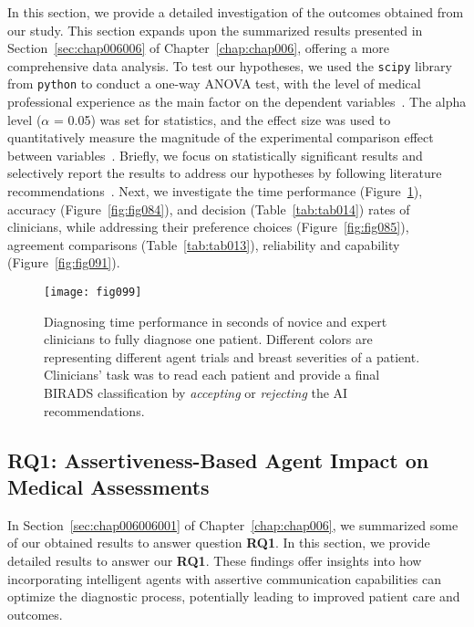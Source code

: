 In this section, we provide a detailed investigation of the outcomes obtained from our study.
This section expands upon the summarized results presented in Section~\ref{sec:chap006006} of Chapter~\ref{chap:chap006}, offering a more comprehensive data analysis.
To test our hypotheses, we used the \texttt{scipy} library from \texttt{python} to conduct a one-way \ac{ANOVA} test, with the level of medical professional experience as the main factor on the dependent variables~\cite{CASALE2022107302}.
The alpha level ($\alpha$ = 0.05) was set for statistics, and the effect size was used to quantitatively measure the magnitude of the experimental comparison effect between variables~\cite{Yigit_Mendes_2018, 10.1145/3180155.3182556}.
Briefly, we focus on statistically significant results and selectively report the results to address our hypotheses by following literature recommendations~\cite{10.1145/3301275.3302289, 10.1145/3290605.3300234, 10.1145/3491102.3517791}.
Next, we investigate the time performance (Figure~\ref{fig:fig099}), accuracy (Figure~\ref{fig:fig084}), and decision (Table~\ref{tab:tab014}) rates of clinicians, while addressing their preference choices (Figure~\ref{fig:fig085}), agreement comparisons (Table~\ref{tab:tab013}), reliability and capability (Figure~\ref{fig:fig091}).

\begin{figure}[htpb]
\centering
\texttt{[image: fig099]}
\caption[]{Diagnosing time performance in seconds of novice and expert clinicians to fully diagnose one patient. Different colors are representing different agent trials and breast severities of a patient. Clinicians' task was to read each patient and provide a final BIRADS classification by {\it accepting} or {\it rejecting} the AI recommendations.}
\label{fig:fig099}
\end{figure}

\subsection{RQ1: Assertiveness-Based Agent Impact on Medical Assessments}
\label{sec:app005007001}

In Section~\ref{sec:chap006006001} of Chapter~\ref{chap:chap006}, we summarized some of our obtained results to answer question {\bf RQ1}.
In this section, we provide detailed results to answer our {\bf RQ1}.
These findings offer insights into how incorporating intelligent agents with assertive communication capabilities can optimize the diagnostic process, potentially leading to improved patient care and outcomes.

